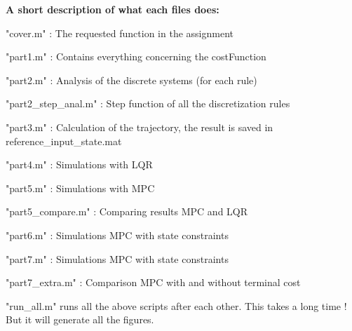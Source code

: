 \textbf{A short description of what each files does:}

"cover.m" : The requested function in the assignment

"part1.m" : Contains everything concerning the costFunction 

"part2.m" : Analysis of the discrete systems (for each rule)

"part2\_step\_anal.m" : Step function of all the discretization rules

"part3.m" : Calculation of the trajectory, the result is saved in reference\_input\_state.mat

"part4.m" : Simulations with LQR

"part5.m" : Simulations with MPC

"part5\_compare.m" : Comparing results MPC and LQR

"part6.m" : Simulations MPC with state constraints

"part7.m" : Simulations MPC with state constraints

"part7\_extra.m" : Comparison MPC with and without terminal cost

"run\_all.m" runs all the above scripts after each other. This takes a long time ! But it will generate all the figures.